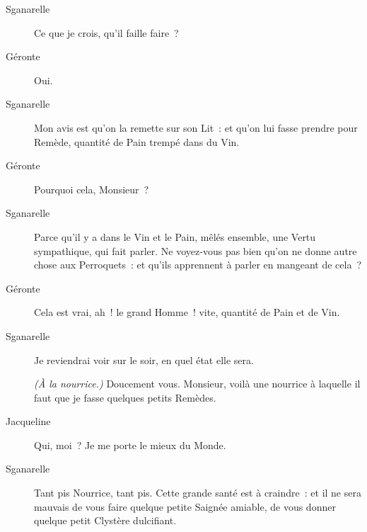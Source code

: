 \documentclass[french,twoside]{book} %
\begin{document}
 \begin{description} \item[Sganarelle] 

Ce que je crois, qu’il faille faire ?\end{description}
 \begin{description} \item[Géronte] 

Oui.\end{description}
 \begin{description} \item[Sganarelle] 

Mon avis est qu’on la remette sur son Lit : et qu’on lui fasse prendre pour Remède, quantité de Pain trempé dans du Vin.\end{description}
 \begin{description} \item[Géronte] 

Pourquoi cela, Monsieur ?\end{description}
 \begin{description} \item[Sganarelle] 

Parce qu’il y a dans le Vin et le Pain, mêlés ensemble, une Vertu sympathique, qui fait parler. Ne voyez-vous pas bien qu’on ne donne autre chose aux Perroquets : et qu’ils apprennent à parler en mangeant de cela ?\end{description}
 \begin{description} \item[Géronte] 

Cela est vrai, ah ! le grand Homme ! vite, quantité de Pain et de Vin.\end{description}
 \begin{description} \item[Sganarelle] 

Je reviendrai voir sur le soir, en quel état elle sera.

\textit{(À la nourrice.) }Doucement vous. Monsieur, voilà une nourrice à laquelle il faut que je fasse quelques petits Remèdes.\end{description}
 \begin{description} \item[Jacqueline] 

Qui, moi ? Je me porte le mieux du Monde.\end{description}
 \begin{description} \item[Sganarelle] 

Tant pis Nourrice, tant pis. Cette grande santé est à craindre : et il ne sera mauvais de vous faire quelque petite Saignée amiable, de vous donner quelque petit Clystère dulcifiant.\end{description}
\end{document}
